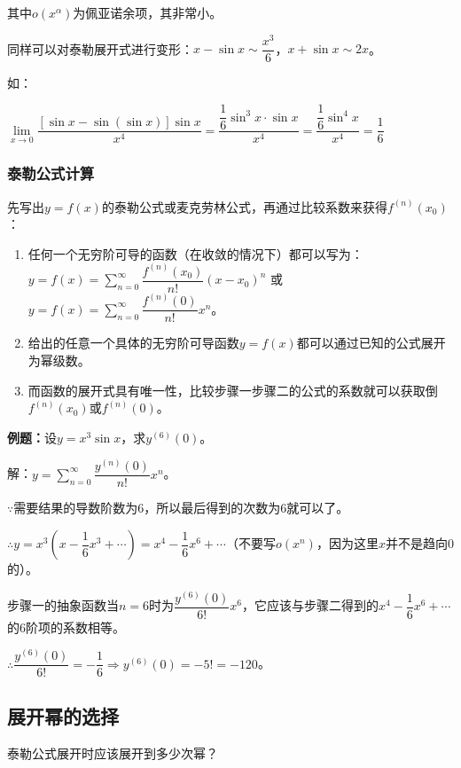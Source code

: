\documentclass[UTF8, 12pt]{ctexart}
\begin{document}
其中$o(x^\alpha)$为佩亚诺余项，其非常小。

同样可以对泰勒展开式进行变形：$x-\sin x\sim\dfrac{x^3}{6}$，$x+\sin x\sim 2x$。

如：

$\lim\limits_{x\to 0}\dfrac{[\sin x-\sin(\sin x)]\sin x}{x^4}=\dfrac{\dfrac{1}{6}\sin^3x\cdot\sin x}{x^4}=\dfrac{\dfrac{1}{6}\sin^4x}{x^4}=\dfrac{1}{6}$

\subsubsection{泰勒公式计算}

先写出$y=f(x)$的泰勒公式或麦克劳林公式，再通过比较系数来获得$f^{(n)}(x_0)$：

\begin{enumerate}
    \item 任何一个无穷阶可导的函数（在收敛的情况下）都可以写为： \medskip \\
    $y=f(x)=\sum_{n=0}^\infty\dfrac{f^{(n)}(x_0)}{n!}(x-x_0)^n$ 或 $y=f(x)=\sum_{n=0}^\infty\dfrac{f^{(n)}(0)}{n!}x^n$。
    \item 给出的任意一个具体的无穷阶可导函数$y=f(x)$都可以通过已知的公式展开为幂级数。
    \item 而函数的展开式具有唯一性，比较步骤一步骤二的公式的系数就可以获取倒$f^{(n)}(x_0)$或$f^{(n)}(0)$。
\end{enumerate}

\textbf{例题：}设$y=x^3\sin x$，求$y^{(6)}(0)$。\medskip

解：$y=\sum_{n=0}^\infty\dfrac{y^{(n)}(0)}{n!}x^n$。\medskip

$\because$需要结果的导数阶数为6，所以最后得到的次数为6就可以了。\medskip

$\therefore y=x^3\left(x-\dfrac{1}{6}x^3+\cdots\right)=x^4-\dfrac{1}{6}x^6+\cdots$（不要写$o(x^n)$，因为这里$x$并不是趋向0的）。

步骤一的抽象函数当$n=6$时为$\dfrac{y^{(6)}(0)}{6!}x^6$，它应该与步骤二得到的$x^4-\dfrac{1}{6}x^6+\cdots$的6阶项的系数相等。

$\therefore \dfrac{y^{(6)}(0)}{6!}=-\dfrac{1}{6}\Rightarrow y^{(6)}(0)=-5!=-120$。

\subsection{展开幂的选择}

泰勒公式展开时应该展开到多少次幂？
\end{document}
